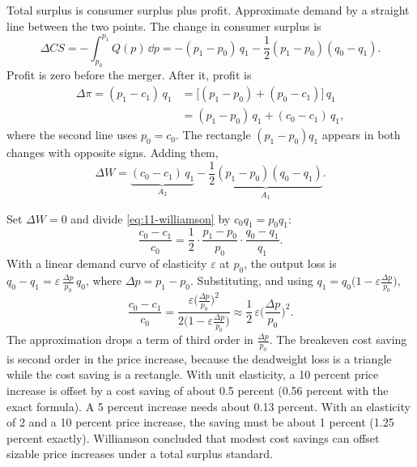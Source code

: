 Total surplus is consumer surplus plus profit. Approximate demand by a straight line between the two points. The
change in consumer surplus is
\begin{equation*}
\Delta CS = -\int_{p_0}^{p_1} Q(p)\,\dd p = -(p_1 - p_0)\,q_1 - \frac{1}{2}(p_1 - p_0)(q_0 - q_1).
\end{equation*}
Profit is zero before the merger. After it, profit is
\begin{align*}
\Delta\pi = (p_1 - c_1)\,q_1
&= \big[(p_1 - p_0) + (p_0 - c_1)\big]\,q_1 \\
&= (p_1 - p_0)\,q_1 + (c_0 - c_1)\,q_1,
\end{align*}
where the second line uses $p_0 = c_0$. The rectangle $(p_1 - p_0)q_1$ appears in both changes with opposite
signs. Adding them,
\begin{equation}\label{eq:11-williamson}
\Delta W = \underbrace{(c_0 - c_1)\,q_1}_{A_2} - \underbrace{\frac{1}{2}(p_1 - p_0)(q_0 - q_1)}_{A_1}.
\end{equation}

Set $\Delta W = 0$ and divide \eqref{eq:11-williamson} by $c_0 q_1 = p_0 q_1$:
\begin{equation*}
\frac{c_0 - c_1}{c_0} = \frac{1}{2}\cdot\frac{p_1 - p_0}{p_0}\cdot\frac{q_0 - q_1}{q_1}.
\end{equation*}
With a linear demand curve of elasticity $\varepsilon$ at $p_0$, the output loss is
$q_0 - q_1 = \varepsilon\,\frac{\Delta p}{p_0}\,q_0$, where $\Delta p = p_1 - p_0$. Substituting, and using
$q_1 = q_0\big(1 - \varepsilon\frac{\Delta p}{p_0}\big)$,
\begin{equation}\label{eq:11-williamson-saving}
\frac{c_0 - c_1}{c_0} = \frac{\varepsilon\big(\frac{\Delta p}{p_0}\big)^2}{2\big(1 - \varepsilon\frac{\Delta p}{p_0}\big)}
\approx \frac{1}{2}\,\varepsilon\Big(\frac{\Delta p}{p_0}\Big)^2.
\end{equation}
The approximation drops a term of third order in $\frac{\Delta p}{p_0}$. The breakeven cost saving is second order
in the price increase, because the deadweight loss is a triangle while the cost saving is a rectangle. With unit
elasticity, a 10 percent price increase is offset by a cost saving of about 0.5 percent (0.56 percent with the
exact formula). A 5 percent increase needs about 0.13 percent. With an elasticity of 2 and a 10 percent price
increase, the saving must be about 1 percent (1.25 percent exactly). Williamson concluded that modest cost savings
can offset sizable price increases under a total surplus standard.

